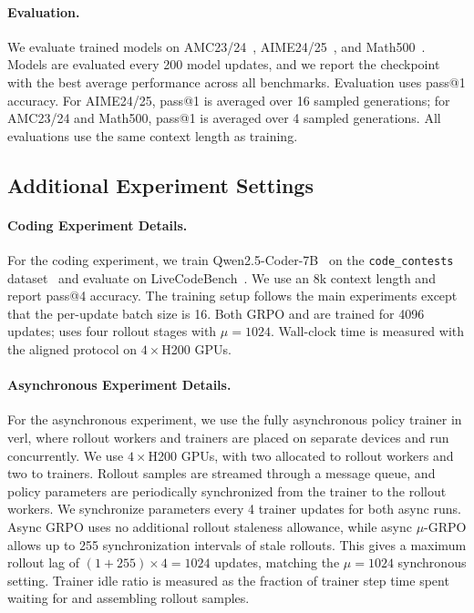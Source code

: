 \paragraph{Evaluation.} We evaluate trained models on AMC23/24~\citep{aops_amc}, AIME24/25~\citep{aops_aime}, and Math500~\citep{hendrycks2021measuringmathematicalproblemsolving, lightman2023letsverifystepstep}. Models are evaluated every 200 model updates, and we report the checkpoint with the best average performance across all benchmarks. Evaluation uses pass@1 accuracy. For AIME24/25, pass@1 is averaged over 16 sampled generations; for AMC23/24 and Math500, pass@1 is averaged over 4 sampled generations. All evaluations use the same context length as training. 

\subsection{Additional Experiment Settings}
\paragraph{Coding Experiment Details.}
For the coding experiment, we train Qwen2.5-Coder-7B~\citep{hui2024qwen25codertechnicalreport}
on the \texttt{code\_contests} dataset~\citep{sun2026improvingdataefficiencyllm}
and evaluate on LiveCodeBench~\citep{jain2024livecodebenchholisticcontaminationfree}.
We use an 8k context length and report pass@4 accuracy. The training setup follows
the main experiments except that the per-update batch size is 16. Both GRPO and
\ourmethod{} are trained for 4096 updates; \ourmethod{} uses four rollout stages
with $\mu=1024$. Wall-clock time is measured with the aligned protocol on
$4\times$H200 GPUs.

\paragraph{Asynchronous Experiment Details.}
For the asynchronous experiment, we use the fully asynchronous policy trainer in verl, where rollout workers and trainers are placed on separate devices and run concurrently. We use $4\times$H200 GPUs, with two allocated to rollout workers and two to trainers. Rollout samples are streamed through a message queue, and policy parameters are periodically synchronized from the trainer to the rollout workers. We synchronize parameters every 4 trainer updates for both async runs. Async GRPO uses no additional rollout staleness allowance, while async $\mu$-GRPO allows up to 255 synchronization intervals of stale rollouts. This gives a maximum rollout lag of $(1+255)\times 4=1024$ updates, matching the $\mu=1024$ synchronous setting. Trainer idle ratio is measured as the fraction of trainer step time spent waiting for and assembling rollout samples.